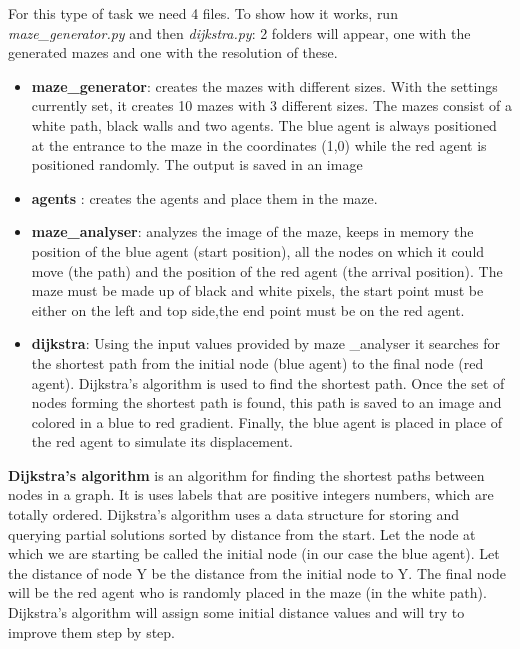 For this type of task we need 4 files. To show how it works, run \textit{maze\_generator.py} and then \textit{dijkstra.py}: 2 folders will appear, one with the generated mazes and one with the resolution of these. 
\begin{itemize}
\item \textbf{maze\_generator}: creates the mazes with different sizes. With the settings currently set, it creates 10 mazes with 3 different sizes. The mazes consist of a white path, black walls and two agents. The blue agent is always positioned at the entrance to the maze in the coordinates (1,0) while the red agent is positioned randomly. The output is saved in an image
\item\textbf{agents }: creates the agents and place them in the maze. 
\item\textbf{maze\_analyser}: analyzes the image of the maze, keeps in memory the position of the blue agent (start position), all the nodes on which it could move (the path) and the position of the red agent (the arrival position).  The maze must be made up of black and white pixels, the start point must be either on the left and top side,the end point must be on the red agent.
	
\item \textbf{dijkstra}: Using the input values ​​provided by maze \_analyser it searches for the shortest path from the initial node (blue agent) to the final node (red agent). Dijkstra's algorithm is used to find the shortest path. Once the set of nodes forming the shortest path is found, this path is saved to an image and colored in a blue to red gradient. Finally, the blue agent is placed in place of the red agent to simulate its displacement.
\end{itemize}

\textbf{Dijkstra's algorithm} is an algorithm for finding the shortest paths between nodes in a graph. It is uses labels that are positive integers numbers, which are totally ordered.
Dijkstra's algorithm uses a data structure for storing and querying partial solutions sorted by distance from the start.
Let the node at which we are starting be called the initial node (in our case the blue agent). Let the distance of node Y be the distance from the initial node to Y. 
The final node will be the red agent who is randomly placed in the maze (in the white path).
Dijkstra's algorithm will assign some initial distance values and will try to improve them step by step. 


